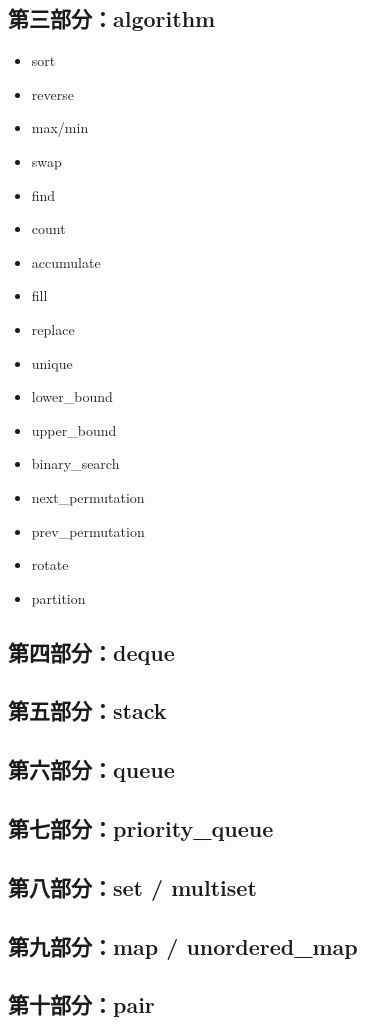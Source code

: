 \documentclass[10pt,twocolumn]{extarticle}
\begin{document}
\subsection*{第三部分：algorithm}
\begin{itemize}
    \item sort
    \item reverse
    \item max/min
    \item swap
    \item find
    \item count
    \item accumulate
    \item fill
    \item replace
    \item unique
    \item lower\_bound
    \item upper\_bound
    \item binary\_search
    \item next\_permutation
    \item prev\_permutation
    \item rotate
    \item partition
\end{itemize}

\subsection*{第四部分：deque}
\subsection*{第五部分：stack}
\subsection*{第六部分：queue}
\subsection*{第七部分：priority\_queue}
\subsection*{第八部分：set / multiset}
\subsection*{第九部分：map / unordered\_map}
\subsection*{第十部分：pair}
\end{document}
